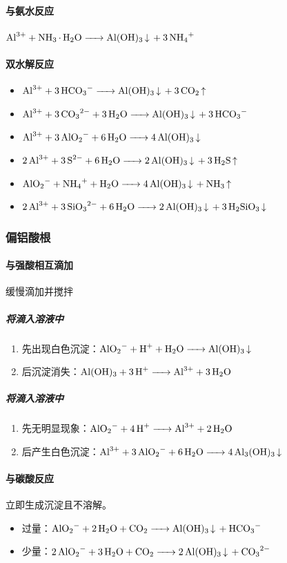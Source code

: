 \documentclass[a4paper]{article}
\begin{document}
	\paragraph{与氨水反应}
	$\ce{Al^3+ + NH3*H2O -> Al(OH)3 v + 3NH4+}\\$
	\paragraph{双水解反应}
	\begin{itemize}
		\item $\ce{Al^3+ + 3HCO3- -> Al(OH)3 v + 3CO2 ^}$
		\item $\ce{Al^3+ + 3CO3^2- + 3H2O -> Al(OH)3 v + 3HCO3-}$
		\item $\ce{Al^3+ + 3AlO2- + 6H2O -> 4Al(OH)3 v}$
		\item $\ce{2Al^3+ + 3S^2- + 6H2O -> 2Al(OH)3 v + 3H2S ^}$
		\item $\ce{AlO2- + NH4+ + H2O -> 4Al(OH)3 v + NH3 ^}$
		\item $\ce{2Al^3+ + 3SiO3^2- + 6H2O -> 2Al(OH)3 v + 3H2SiO3 v}$
	\end{itemize}
	

	\subsubsection{偏铝酸根}
	\paragraph{与强酸相互滴加}缓慢滴加并搅拌
	\subparagraph{将滴入溶液中}
	\begin{enumerate}
		\item 先出现白色沉淀：$\ce{AlO2- + H+ + H2O -> Al(OH)3 v}\\$
		\item 后沉淀消失：$\ce{Al(OH)3 + 3H+ -> Al^3+ + 3H2O}\\$
	\end{enumerate}
	\subparagraph{将滴入溶液中}
	\begin{enumerate}
		\item 先无明显现象：$\ce{AlO2- + 4H+ -> Al^3+ + 2H2O}\\$
		\item 后产生白色沉淀：$\ce{Al^3+ + 3AlO2- + 6H2O -> 4Al3(OH)3 v}\\$
	\end{enumerate}
	\paragraph{与碳酸反应}
	立即生成沉淀且不溶解。
	\begin{itemize}
		\item {}过量：$\ce{AlO2- + 2H2O + CO2 -> Al(OH)3 v + HCO3-}\\$
		\item {}少量：$\ce{2AlO2- + 3H2O + CO2 -> 2Al(OH)3 v + CO3^2-}\\$
	\end{itemize}
\end{document}
